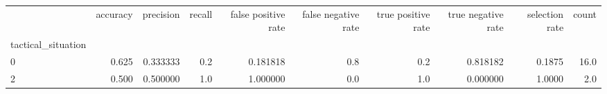 \begin{tabular}{lrrrrrrrrr}
\toprule
{} &  accuracy &  precision &  recall &  false positive rate &  false negative rate &  true positive rate &  true negative rate &  selection rate &  count \\
tactical\_situation &           &            &         &                      &                      &                     &                     &                 &        \\
\midrule
0                  &     0.625 &   0.333333 &     0.2 &             0.181818 &                  0.8 &                 0.2 &            0.818182 &          0.1875 &   16.0 \\
2                  &     0.500 &   0.500000 &     1.0 &             1.000000 &                  0.0 &                 1.0 &            0.000000 &          1.0000 &    2.0 \\
\bottomrule
\end{tabular}
